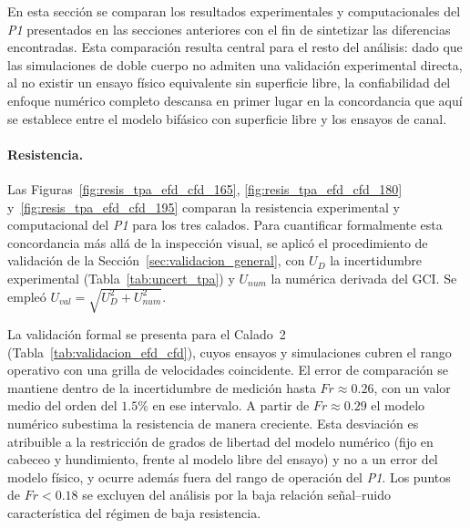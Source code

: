 En esta sección se comparan los resultados experimentales y computacionales 
del \textit{P1} presentados en las secciones anteriores con el fin de 
sintetizar las diferencias encontradas. Esta comparación resulta central para 
el resto del análisis: dado que las simulaciones de doble cuerpo no admiten 
una validación experimental directa, al no existir un ensayo físico equivalente 
sin superficie libre, la confiabilidad del enfoque numérico completo descansa 
en primer lugar en la concordancia que aquí se establece entre el modelo 
bifásico con superficie libre y los ensayos de canal.

\paragraph{Resistencia.} Las Figuras~\ref{fig:resis_tpa_efd_cfd_165}, \ref{fig:resis_tpa_efd_cfd_180} 
y~\ref{fig:resis_tpa_efd_cfd_195} comparan la resistencia experimental y
computacional del \textit{P1} para los tres calados. Para cuantificar
formalmente esta concordancia más allá de la inspección visual, se aplicó el
procedimiento de validación de la Sección~\ref{sec:validacion_general}, con $U_D$ la incertidumbre experimental
(Tabla~\ref{tab:uncert_tpa}) y $U_{num}$ la numérica derivada del GCI. Se empleó $U_{val}=\sqrt{U_D^2+U_{num}^2}$.

La validación formal se presenta para el Calado~2
(Tabla~\ref{tab:validacion_efd_cfd}), cuyos ensayos y simulaciones cubren el
rango operativo con una grilla de velocidades coincidente. El error de
comparación se mantiene dentro de la incertidumbre de medición hasta
$Fr \approx 0{.}26$, con un valor medio del orden del $1{.}5\%$ en ese
intervalo. A partir de $Fr \approx 0{.}29$ el modelo numérico subestima la
resistencia de manera creciente. Esta desviación es atribuible a la
restricción de grados de libertad del modelo numérico (fijo en cabeceo y
hundimiento, frente al modelo libre del ensayo) y no a un error del modelo
físico, y ocurre además fuera del rango de operación del \textit{P1}. Los
puntos de $Fr < 0{.}18$ se excluyen del análisis por la baja relación
señal--ruido característica del régimen de baja resistencia.


